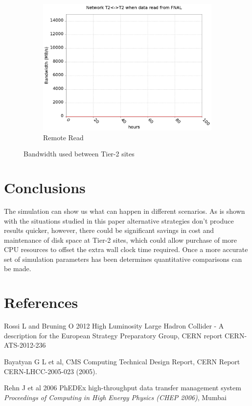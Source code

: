 \documentclass[a4paper]{jpconf}
\begin{document}
\begin{figure}
\begin{subfigure}{0.3\textwidth}
    \includegraphics[width=\textwidth]{figures/F_FP0_RP0DataT2.png}
    \caption{Remote Read\label{fig:tier2Remote}}
  \end{subfigure}
  \caption{Bandwidth used between Tier-2 sites\label{fig:tier2}}
\end{figure}

\section{Conclusions}

The simulation can show us what can happen in different scenarios. As
is shown with the situations studied in this paper alternative
strategies don't produce results quicker, however, there could be
significant savings in cost and maintenance of disk space at Tier-2
sites, which could allow purchase of more CPU resources to offset the
extra wall clock time required. Once a more accurate set of simulation
parameters has been determines quantitative comparisons can be made.

\section*{References}
\begin{thebibliography}{9}

 Rossi L and Bruning O 2012 High Luminosity Large Hadron
  Collider - A description for the European Strategy Preparatory
  Group, CERN report CERN-ATS-2012-236

 Bayatyan G L et al,  CMS Computing Technical Design
  Report, CERN Report CERN-LHCC-2005-023 (2005).

 Rehn J et al 2006 PhEDEx high-throughput data
  transfer management system {\it Proceedings of Computing in High
    Energy Physics (CHEP 2006)}, Mumbai

\end{thebibliography}
\end{document}
